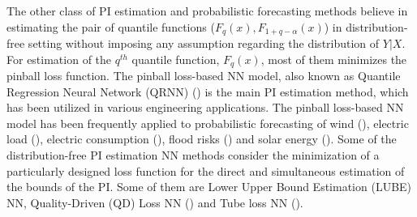 \documentclass[10pt]{article} %
\begin{document}
The other class of PI estimation and probabilistic forecasting methods believe in estimating the  pair of quantile functions ($F_{q}(x),F_{1+q-\alpha}(x)$) in distribution-free setting without imposing any assumption regarding the distribution of $Y|X$. For estimation of the  $q^{th}$ quantile function, $F_q(x)$, most of them minimizes the  pinball loss function.  The pinball loss-based NN model, also known as Quantile Regression Neural Network (QRNN) (\cite{taylor2000quantile,cannon2011quantile}) is the main PI estimation method, which has been utilized in various engineering applications. The pinball loss-based NN model has been frequently applied to probabilistic forecasting of wind (\cite{wan2016direct}),  electric load (\cite{zhang2018improved,zhang2020improving}), electric consumption (\cite{he2019electricity}), flood risks (\cite{pasche2024neural}) and solar energy (\cite{lauret2017probabilistic}). 
Some of the distribution-free PI estimation  NN methods consider the minimization of a particularly designed loss function for the direct and simultaneous estimation of the bounds of the PI. Some of them are Lower Upper Bound Estimation (LUBE) NN, Quality-Driven (QD) Loss NN (\cite{pearce2018high}) and Tube loss NN (\cite{anand2024tube}).
\end{document}
